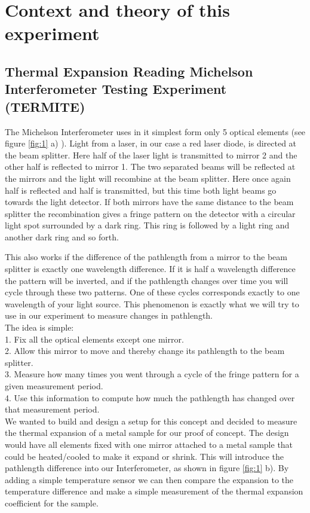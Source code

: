 \documentclass[a4paper,10pt]{article}
\begin{document}
\section*{Context and theory of this experiment}

\subsection*{Thermal Expansion Reading Michelson Interferometer Testing Experiment \\ (TERMITE)}
The Michelson Interferometer uses in it simplest form only 5 optical elements (see figure \ref{fig:1} a) ). Light from a laser, in our case a red laser diode, is directed at the beam splitter. Here half of the laser light is transmitted to mirror 2 and the other half is reflected to mirror 1. The two separated beams will be reflected at the mirrors and the light will recombine at the beam splitter. Here once again half is reflected and half is transmitted, but this time both light beams go towards the light detector. If both mirrors have the same distance to the beam splitter the recombination gives a fringe pattern on the detector with a circular light spot surrounded by a dark ring. This ring is followed by a light ring and another dark ring and so forth.

This also works if the difference of the pathlength from a mirror to the beam splitter is exactly one wavelength difference. If it is half a wavelength difference the pattern will be inverted, and if the pathlength changes over time you will cycle through these two patterns. One of these cycles corresponds exactly to one wavelength of your light source. This phenomenon is exactly what we will try to use in our experiment to measure changes in pathlength.\\

\noindent The idea is simple:\\
1.	Fix all the optical elements except one mirror.\\
2.	Allow this mirror to move and thereby change its pathlength to the beam splitter.\\
3.	Measure how many times you went through a cycle of the fringe pattern for a given measurement period.\\
4.	Use this information to compute how much the pathlength has changed over that measurement period.\\

\noindent We wanted to build and design a setup for this concept and decided to measure the thermal expansion of a metal sample for our proof of concept. The design would have all elements fixed with one mirror attached to a metal sample that could be heated/cooled to make it expand or shrink. This will introduce the pathlength difference into our Interferometer, as shown in figure \ref{fig:1} b). By adding a simple temperature sensor we can then compare the expansion to the temperature difference and make a simple measurement of the thermal expansion coefficient for the sample.
\end{document}
